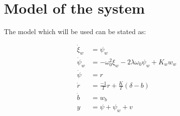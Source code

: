 \section{Model of the system}

The model which will be used can be stated as:

\begin{subequations}
\begin{align}
    \dot{\xi}_w &= \psi_w \label{eq: dotxi} \\
    \dot{\psi}_w &= -\omega^2_0\xi_w-2\lambda\omega_0\psi_w+K_ww_w \label{eq: dotpsi_w} \\
    \dot{\psi} &= r \label{eq: dotpsi} \\
    \dot{r} &= \frac{-1}{T}r+\frac{K}{T}(\delta-b) \label{eq: dotr} \\
    \dot{b} &= w_b \label{eq: dotb} \\
    y &= \psi+\psi_w+v \label{eq: y}
\end{align}
\end{subequations}